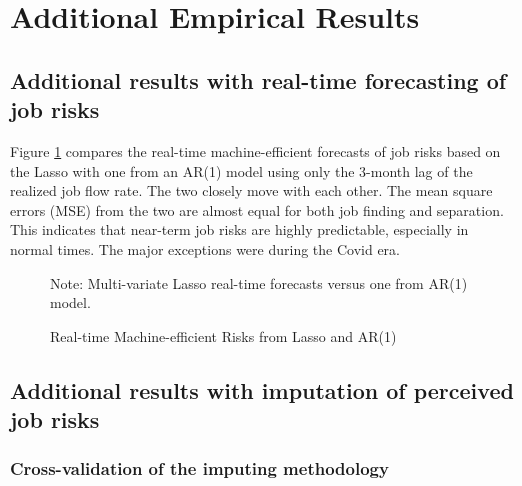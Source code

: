 \pagebreak 

\appendix
\setcounter{figure}{0} \renewcommand{\thefigure}{A.\arabic{figure}}
\setcounter{table}{0} \renewcommand{\thetable}{A.\arabic{table}}
\section{Additional Empirical Results}
\label{sec:appendix}


\subsection{Additional results with real-time forecasting of job risks}
\label{appendix:real_time_results_more}


Figure \ref{fig:real_time_ar} compares the real-time machine-efficient forecasts of job risks based on the Lasso with one from an AR(1) model using only the 3-month lag of the realized job flow rate. The two closely move with each other. The mean square errors (MSE) from the two are almost equal for both job finding and separation. This indicates that near-term job risks are highly predictable, especially in normal times. The major exceptions were during the Covid era. 

 \begin{figure}[ht]
    	\caption{Real-time Machine-efficient Risks from Lasso and AR(1)}
    	\label{fig:real_time_ar}
    	\begin{center}
    	\end{center}
    	
    	\begin{flushleft}\footnotesize{Note: Multi-variate Lasso real-time forecasts versus one from AR(1) model.}\end{flushleft}
    \end{figure}


\subsection{Additional results with imputation of perceived job risks}



\subsubsection{Cross-validation of the imputing methodology}

